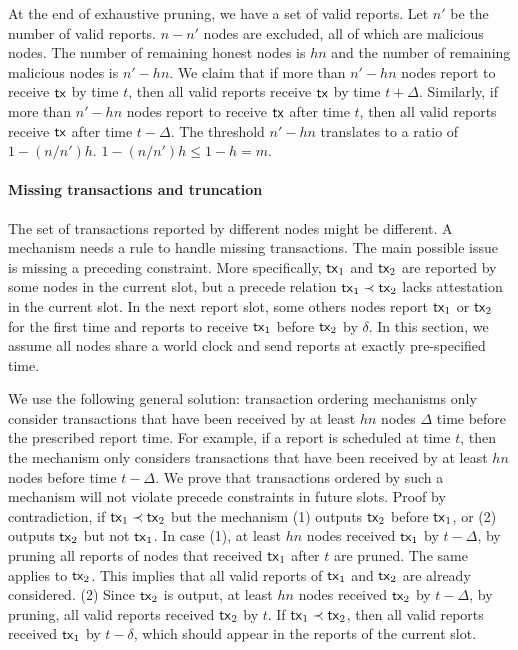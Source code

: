 \documentclass[runningheads]{llncs}
\begin{document}
%

At the end of exhaustive pruning, we have a set of valid reports. Let $n'$ be the number of valid reports. $n-n'$ nodes are excluded, all of which are malicious nodes. The number of remaining honest nodes is $hn$ and the number of remaining malicious nodes is $n'-hn$. We claim that if more than $n'-hn$ nodes report to receive $\mathsf{tx}$ by time $t$, then all valid reports receive $\mathsf{tx}$ by time $t+\Delta$. Similarly, if more than $n'-hn$ nodes report to receive $\mathsf{tx}$ after time $t$, then all valid reports receive $\mathsf{tx}$ after time $t-\Delta$. The threshold $n'-hn$ translates to a ratio of $1-(n/n')h$. $1-(n/n')h \le 1-h = m$. 


 
\paragraph{Missing transactions and truncation} The set of transactions reported by different nodes might be different. A mechanism needs a rule to handle missing transactions. The main possible issue is missing a preceding constraint. More specifically, $\mathsf{tx}_1$ and $\mathsf{tx}_2$ are reported by some nodes in the current slot, but a precede relation $\mathsf{tx}_1\prec \mathsf{tx}_2$ lacks attestation in the current slot. In the next report slot, some others nodes report $\mathsf{tx}_1$ or $\mathsf{tx}_2$ for the first time and reports to receive $\mathsf{tx}_1$ before $\mathsf{tx}_2$ by $\delta$.  In this section, we assume all nodes share a world clock and send reports at exactly pre-specified time. 

We use the following general solution: transaction ordering mechanisms only consider transactions that have been received by at least $hn$ nodes $\Delta$ time before the prescribed report time.  For example, if a report is scheduled at time $t$, then the mechanism only considers transactions that have been received by at least $hn$ nodes before time $t-\Delta$. We prove that transactions ordered by such a mechanism will not violate precede constraints in future slots. Proof by contradiction, if $\mathsf{tx}_1\prec \mathsf{tx}_2$ but the mechanism (1) outputs $\mathsf{tx}_2$ before $\mathsf{tx}_1$, or (2) outputs $\mathsf{tx}_2$ but not $\mathsf{tx}_1$. In case (1), at least $hn$ nodes received $\mathsf{tx}_1$ by $t-\Delta$, by pruning all reports of nodes that received $\mathsf{tx}_1$ after $t$ are pruned. The same applies to $\mathsf{tx}_2$. This implies that all valid reports of $\mathsf{tx}_1$ and $\mathsf{tx}_2$ are already considered. (2) Since $\mathsf{tx}_2$ is output, at least $hn$ nodes received $\mathsf{tx}_2$ by $t-\Delta$, by pruning, all valid reports received $\mathsf{tx}_2$ by $t$. If $\mathsf{tx}_1\prec \mathsf{tx}_2$, then all valid reports received $\mathsf{tx}_1$ by $t-\delta$, which should appear in the reports of the current slot. 
\end{document}
